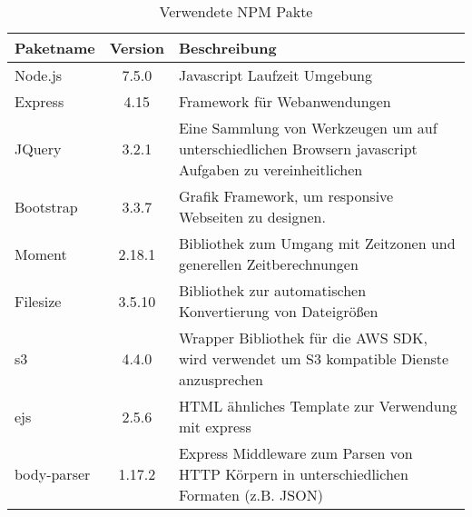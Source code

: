 \begin{table}
	\centering
	\label{tbl:npmpackages}
		\begin{tabular}{ l | c | p{10cm}}
			\hline
			Paketname & Version & Beschreibung \\ \hline
			Node.js & 7.5.0 & Javascript Laufzeit Umgebung \\
			Express & 4.15 & Framework für Webanwendungen \\
			JQuery & 3.2.1 & Eine Sammlung von Werkzeugen um auf unterschiedlichen Browsern javascript Aufgaben zu vereinheitlichen \\
			Bootstrap & 3.3.7 & Grafik Framework, um responsive Webseiten zu designen. \\
			Moment & 2.18.1 & Bibliothek zum Umgang mit Zeitzonen und generellen Zeitberechnungen \\
			Filesize & 3.5.10 & Bibliothek zur automatischen Konvertierung von Dateigrößen \\
			s3 & 4.4.0 & Wrapper Bibliothek für die AWS SDK, wird verwendet um S3 kompatible Dienste anzusprechen \\
			ejs & 2.5.6 & HTML ähnliches Template zur Verwendung mit express \\
			body-parser & 1.17.2 & Express Middleware zum Parsen von HTTP Körpern in unterschiedlichen Formaten (z.B. JSON)
		\end{tabular}
		\caption{Verwendete NPM Pakte}
\end{table}


